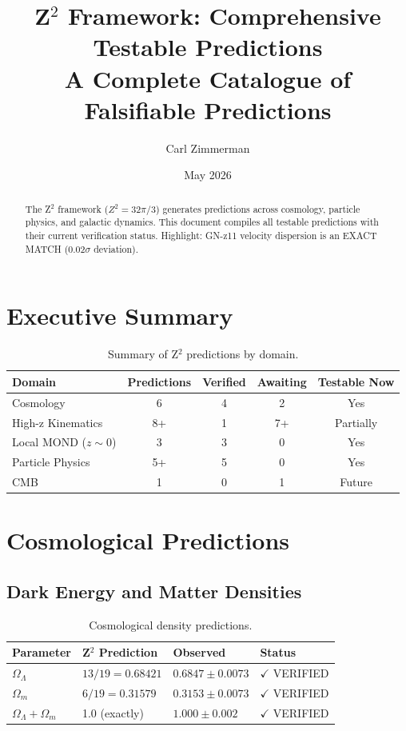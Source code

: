 \documentclass[12pt,a4paper]{article}
\title{\textbf{Z$^2$ Framework: Comprehensive Testable Predictions}\\[0.5em]
\large A Complete Catalogue of Falsifiable Predictions}
\author{Carl Zimmerman}
\date{May 2026}
\begin{document}
\maketitle

\begin{abstract}
The Z$^2$ framework ($Z^2 = 32\pi/3$) generates predictions across cosmology, particle physics, and galactic dynamics. This document compiles all testable predictions with their current verification status. Highlight: GN-z11 velocity dispersion is an EXACT MATCH (0.02$\sigma$ deviation).
\end{abstract}

\tableofcontents
\newpage

\section{Executive Summary}

\begin{table}[h]
\centering
\begin{tabular}{@{}lcccc@{}}
\toprule
Domain & Predictions & Verified & Awaiting & Testable Now \\
\midrule
Cosmology & 6 & 4 & 2 & Yes \\
High-z Kinematics & 8+ & 1 & 7+ & Partially \\
Local MOND ($z\sim 0$) & 3 & 3 & 0 & Yes \\
Particle Physics & 5+ & 5 & 0 & Yes \\
CMB & 1 & 0 & 1 & Future \\
\bottomrule
\end{tabular}
\caption{Summary of Z$^2$ predictions by domain.}
\end{table}

\section{Cosmological Predictions}

\subsection{Dark Energy and Matter Densities}

\begin{table}[h]
\centering
\begin{tabular}{@{}llll@{}}
\toprule
Parameter & Z$^2$ Prediction & Observed & Status \\
\midrule
$\Omega_\Lambda$ & $13/19 = 0.68421$ & $0.6847 \pm 0.0073$ & $\checkmark$ VERIFIED \\
$\Omega_m$ & $6/19 = 0.31579$ & $0.3153 \pm 0.0073$ & $\checkmark$ VERIFIED \\
$\Omega_\Lambda + \Omega_m$ & 1.0 (exactly) & $1.000 \pm 0.002$ & $\checkmark$ VERIFIED \\
\bottomrule
\end{tabular}
\caption{Cosmological density predictions.}
\end{table}
\end{document}
